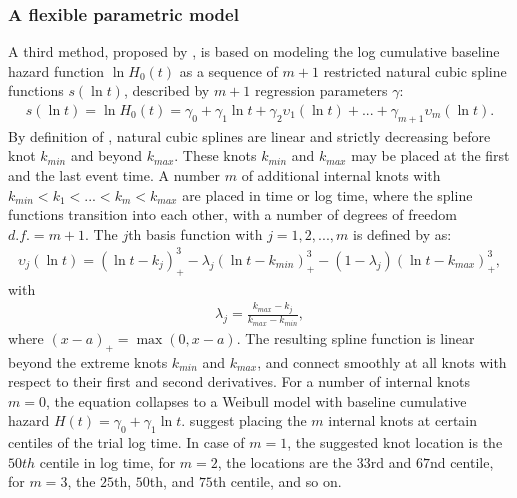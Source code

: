 \documentclass[main.tex]{subfiles}
\begin{document}
\subsubsection{A flexible parametric model}
A third method, proposed by \textcite{Royston2002-ud}, is based on modeling the log cumulative baseline hazard function $\ln{H_0(t)}$ as a sequence of $m+1$ restricted natural cubic spline functions $s(\ln{t})$, described by $m+1$ regression parameters $\gamma$:
\begin{align}
s(\ln{t}) = \ln{H_0(t)}=\gamma_0 + \gamma_1\ln{t}+\gamma_2\upsilon_1(\ln{t}) + ... + \gamma_{m+1}\upsilon_m (\ln{t}).
\end{align}
By definition of \textcite{Royston2002-ud}, natural cubic splines are linear and strictly decreasing before knot $k_{min}$ and beyond $k_{max}$. These knots $k_{min}$ and $k_{max}$ may be placed at the first and the last event time. A number $m$ of additional internal knots with $k_{min} < k_1 < ... < k_m < k_{max}$ are placed in time or log time, where the spline functions transition into each other, with a number of degrees of freedom $d.f. = m+1$. The $j$th basis function with $j = 1, 2, ..., m$ is defined by \textcite{Royston2002-ud} as:
\begin{align}
\upsilon_j(\ln{t}) = (\ln{t} - k_j)^3_+ - \lambda_j(\ln{t}-k_{min})^3_+ - (1-\lambda_j)(\ln{t}-k_{max})^3_+,
\end{align}
with
\begin{align}
\lambda_j = \frac{k_{max} - k_j}{k_{max} - k_{min}},
\end{align}
where $(x-a)_+ = \max({0, x-a})$. The resulting spline function is linear beyond the extreme knots $k_{min}$ and $k_{max}$, and connect smoothly at all knots with respect to their first and second derivatives. For a number of internal knots $m=0$, the equation collapses to a Weibull model with baseline cumulative hazard $H(t)=\gamma_0+\gamma_1 \ln{t}$.
\textcite{lambert2009further} suggest placing the $m$ internal knots at certain centiles of the trial log time. In case of $m=1$, the suggested knot location is the $50th$ centile in log time, for $m=2$, the locations are the $33$rd and $67$nd centile, for $m=3$, the $25$th, $50$th, and $75$th centile, and so on.
\end{document}
